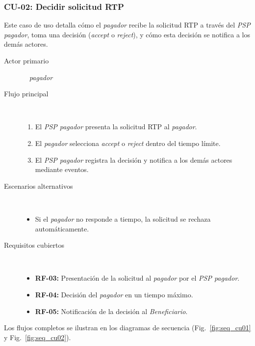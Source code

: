 \subsubsection{CU-02: Decidir solicitud RTP}
Este caso de uso detalla cómo el \textit{pagador} recibe la solicitud RTP a través del \textit{PSP pagador}, toma una decisión (\textit{accept} o \textit{reject}), y cómo esta decisión se notifica a los demás actores.
\begin{description}
  \item[Actor primario] ~ \textit{pagador}
  \item[Flujo principal] ~
    \begin{enumerate}
      \item El \textit{PSP pagador} presenta la solicitud RTP al \textit{pagador}.
      \item El \textit{pagador} selecciona \textit{accept} o \textit{reject} dentro del tiempo límite.
      \item El \textit{PSP pagador} registra la decisión y notifica a los demás actores mediante eventos.
    \end{enumerate}
  \item[Escenarios alternativos] ~
    \begin{itemize}
      \item Si el \textit{pagador} no responde a tiempo, la solicitud se rechaza automáticamente.
    \end{itemize}
  \item[Requisitos cubiertos] ~
    \begin{itemize}
      \item \textbf{RF-03:} Presentación de la solicitud al \textit{pagador} por el \textit{PSP pagador}.
      \item \textbf{RF-04:} Decisión del \textit{pagador} en un tiempo máximo.
      \item \textbf{RF-05:} Notificación de la decisión al \textit{Beneficiario}.
    \end{itemize}
\end{description}

Los flujos completos se ilustran en los diagramas de secuencia (Fig.~\ref{fig:seq_cu01} y Fig.~\ref{fig:seq_cu02}).

